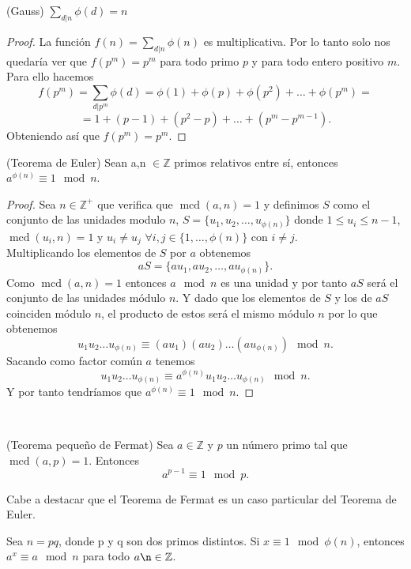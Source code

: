 \begin{lema}
		(Gauss) $\sum_{d|n}\phi(d)=n$
\end{lema}
\begin{proof}
		La función $f(n)=\sum_{d|n}\phi(n)$   es multiplicativa. Por lo tanto solo nos quedaría ver que $f(p^m)=p^m$ para todo primo $p$ y para todo entero positivo $m$.\\ Para ello hacemos
		$$
			f(p^m)=\sum_{d|p^m}\phi(d)=\phi(1)+\phi(p)+\phi(p^2)+\dots+\phi(p^m)= 
		$$\vspace*{-7mm}
		$$
			= 1+(p-1)+(p^2-p)+\dots+(p^m-p^{m-1}).
		$$
		Obteniendo así que $f(p^m)=p^m$.
\end{proof}
\begin{teorema}
	(Teorema de Euler) Sean a,n $\in \mathbb{Z}$ primos relativos entre sí, entonces $a^{\phi(n)}\equiv 1 \mod n$.
\end{teorema}
\begin{proof}
		Sea $n\in \mathbb{Z^+}$ que verifica que $\operatorname{mcd}(a,n)=1$ y definimos $S$ como el conjunto de las unidades modulo $n$, $S=\{u_1,u_2,\dots,u_{\phi(n)}\}$ donde $1\leq u_i\leq n-1$, $\operatorname{mcd}(u_i,n)=1$ y $u_i\neq u_j$ $\forall i,j \in \{1,\dots,\phi(n)\}$ con $ i\neq j$.\\
	Multiplicando  los elementos de $S$ por $a$ obtenemos 
	$$
		aS=\{au_1,au_2,\dots,au_{\phi(n)}\}.
	$$
	Como $\operatorname{mcd}(a,n)=1$ entonces $a\mod n$ es una unidad y por tanto $aS$ será el conjunto de las unidades módulo $n$. Y dado que los elementos de $S$ y los de $aS$ coinciden módulo $n$, el producto de estos será el mismo módulo $n$ por lo que obtenemos 
	$$
		u_1u_2\dots u_{\phi(n)} \equiv (au_1)(au_2)\dots (au_{\phi(n)})\mod n.
	$$
	Sacando como factor común $a$ tenemos 
	$$
		u_1u_2\dots u_{\phi(n)} \equiv a^{\phi(n)}u_1u_2\dots u_{\phi(n)}\mod n. 
	$$
	Y por tanto tendríamos que $a^{\phi(n)}\equiv 1 \mod n$.
\end{proof}\\

\begin{teorema}
		(Teorema pequeño de Fermat) Sea $a \in \mathbb{Z}$ y $p$ un número primo tal que $\operatorname{mcd}(a,p)=1$. Entonces
	$$
		a^{p-1} \equiv 1 \mod p.
	$$
\end{teorema}

Cabe a destacar que el Teorema de Fermat es un caso particular del Teorema de Euler.\\

\begin{proposicion}
	Sea $n = pq$, donde p y q son dos primos distintos. Si $x\equiv 1 \mod \phi(n)$, entonces $a^x\equiv a\mod n$ para todo $ a \n \in \mathbb{Z}$.
\end{proposicion}\vspace*{-5mm}

